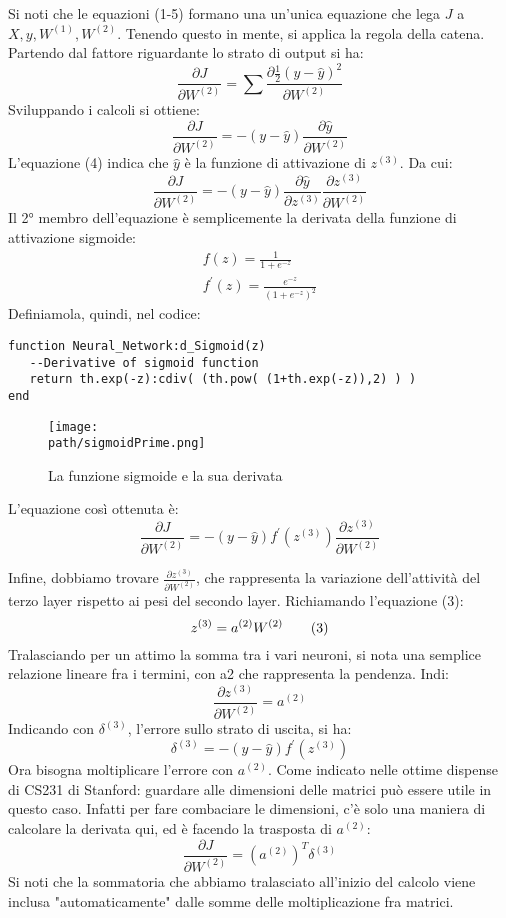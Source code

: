 Si noti che le equazioni (1-5) formano una un'unica equazione che lega $J$ a $X, y, W^{(1)}, W^{(2)}$. Tenendo questo in mente, si applica la regola della catena. \\ 
Partendo dal fattore riguardante lo strato di output si ha: 
$$
\frac{\partial J}{\partial W^{(2)}} = \sum \frac{\partial \frac{1}{2}(y-\hat{y})^2}{\partial W^{(2)}}
$$
Sviluppando i calcoli si ottiene: 
$$
\frac{\partial J}{\partial W^{(2)}} = -(y-\hat{y}) \frac{\partial \hat{y}}{\partial W^{(2)}}
$$
L'equazione (4) indica che $\hat{y}$ è la funzione di attivazione di $z^{(3)}$. Da cui: 
$$
\frac{\partial J}{\partial W^{(2)}} = 
-(y-\hat{y})
\frac{\partial \hat{y}}{\partial z^{(3)}}  
\frac{\partial z^{(3)}}{\partial W^{(2)}}
$$
Il 2° membro dell'equazione è semplicemente la derivata della funzione di attivazione sigmoide: 
\begin{align*}
f(z) = \frac{1}{1+e^{-z}}\\
f^\prime(z) = \frac{e^{-z}}{(1+e^{-z})^2}
\end{align*}
Definiamola, quindi, nel codice: 
\begin{lstlisting}[language={[5.2]Lua}]
function Neural_Network:d_Sigmoid(z)
   --Derivative of sigmoid function
   return th.exp(-z):cdiv( (th.pow( (1+th.exp(-z)),2) ) )
end
\end{lstlisting}
\begin{figure}[h!]
 \centering
 \texttt{[image: \\path/sigmoidPrime.png]}
 \caption{La funzione sigmoide e la sua derivata}
 \label{fig:sigmoidPrime}
\end{figure}

L'equazione così ottenuta è: 
$$
\frac{\partial J}{\partial W^{(2)}}= 
-(y-\hat{y}) f^\prime(z^{(3)}) \frac{\partial z^{(3)}}{\partial W^{(2)}}
$$
 
Infine, dobbiamo trovare $\frac{\partial z^{(3)}}{\partial W^{(2)}}$, che rappresenta la variazione dell'attività del terzo layer rispetto ai pesi del secondo layer. Richiamando l'equazione (3): 
$$
z^{(3)} = a^{(2)}W^{(2)} \tag{3}\\
$$
Tralasciando per un attimo la somma tra i vari neuroni, si nota una semplice relazione lineare fra i termini, con a2 che rappresenta la pendenza. Indi: 
$$
\frac{\partial z^{(3)}}{\partial W^{(2)}} = a^{(2)}
$$
Indicando con $\delta^{(3)}$, l'errore sullo strato di uscita, si ha:
$$
\delta^{(3)} = -(y-\hat{y}) f^\prime(z^{(3)}) 
$$
Ora bisogna moltiplicare l'errore con $a^{(2)}$. Come indicato nelle ottime dispense di CS231 di Stanford\parencite{WCS231vec}: guardare alle dimensioni delle matrici può essere utile in questo caso. Infatti per fare combaciare le dimensioni, c'è solo una maniera di calcolare la derivata qui, ed è facendo la trasposta di $a^{(2)}$: 
$$
\frac{\partial J}{\partial W^{(2)}} = 
(a^{(2)})^T\delta^{(3)}\tag{6}
$$
Si noti che la sommatoria che abbiamo tralasciato all'inizio del calcolo viene inclusa "automaticamente" dalle somme delle moltiplicazione fra matrici.

